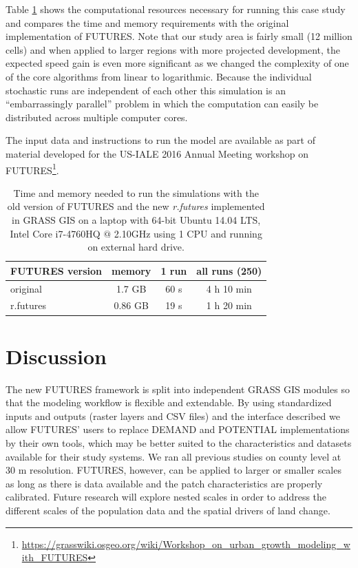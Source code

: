 \documentclass{isprs}
\begin{document}
Table \ref{tab:benchmark} shows the computational resources
necessary for running this case study and compares 
the time and memory requirements with the original
implementation of FUTURES. Note that
our study area is fairly small (12 million cells)
and when applied to larger regions with more projected development, 
the expected speed gain is even more significant
as we changed the complexity of one of the core algorithms from linear to logarithmic.
Because the individual stochastic runs are independent of each other
this simulation is an
``embarrassingly parallel''  problem \cite{herlihy2012art}
in which the computation can easily be distributed across multiple computer cores.

The input data and instructions to run the model are available as part of material
developed for the US-IALE 2016 Annual Meeting workshop on FUTURES\footnote{\url{https://grasswiki.osgeo.org/wiki/Workshop_on_urban_growth_modeling_with_FUTURES}}.

\begin{table}[htp]
 \centering
\begin{center}
\begin{tabular}{lccc}
\toprule
FUTURES version & memory & 1 run & all runs (250)\\ \midrule
original & 1.7 GB & 60 s & 4 h 10 min\\
r.futures  & 0.86 GB & 19 s & 1 h 20 min\\
\bottomrule
\end{tabular}
\end{center}
 \caption{Time and memory needed to run the simulations
 with the old version of FUTURES and the new  \emph{r.futures}
 implemented in GRASS GIS on a laptop with 64-bit Ubuntu 14.04 LTS,
 Intel Core i7-4760HQ $@$ 2.10GHz using 1 CPU and running on external hard drive.}
 \label{tab:benchmark}
\end{table}


\section{Discussion}
The new FUTURES framework is split into independent GRASS GIS modules
so that the modeling workflow is flexible and extendable.
By using standardized inputs and outputs (raster layers and CSV files)
and the interface described
we allow FUTURES' users to replace DEMAND and POTENTIAL implementations
by their own tools, which may be better suited to the characteristics and datasets available for their study systems.
We ran all previous studies on county level at 30 m resolution.
FUTURES, however, can be applied to larger or smaller scales
as long as there is data available and the patch characteristics are properly calibrated.
Future research will explore nested scales
in order to 
address the different scales of the population data
and the spatial drivers of land change.
\end{document}
